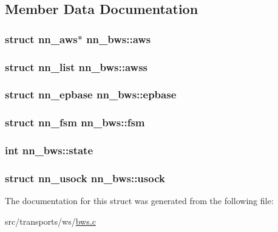 \subsection{Member Data Documentation}
\subsubsection[{aws}]{\setlength{\rightskip}{0pt plus 5cm}struct {\bf nn\+\_\+aws}$\ast$ nn\+\_\+bws\+::aws}\hypertarget{structnn__bws_a718a3274a89d9327c13c956cc9b105a4}{}\label{structnn__bws_a718a3274a89d9327c13c956cc9b105a4}
\subsubsection[{awss}]{\setlength{\rightskip}{0pt plus 5cm}struct {\bf nn\+\_\+list} nn\+\_\+bws\+::awss}\hypertarget{structnn__bws_ac1620e662d0c298115bcda10cfe6df91}{}\label{structnn__bws_ac1620e662d0c298115bcda10cfe6df91}
\subsubsection[{epbase}]{\setlength{\rightskip}{0pt plus 5cm}struct {\bf nn\+\_\+epbase} nn\+\_\+bws\+::epbase}\hypertarget{structnn__bws_ad00de0df67ca0663205c45e207e81bfb}{}\label{structnn__bws_ad00de0df67ca0663205c45e207e81bfb}
\subsubsection[{fsm}]{\setlength{\rightskip}{0pt plus 5cm}struct {\bf nn\+\_\+fsm} nn\+\_\+bws\+::fsm}\hypertarget{structnn__bws_a9418e42dd701ba439685ffaea8e97a02}{}\label{structnn__bws_a9418e42dd701ba439685ffaea8e97a02}
\subsubsection[{state}]{\setlength{\rightskip}{0pt plus 5cm}int nn\+\_\+bws\+::state}\hypertarget{structnn__bws_a0102f70d814af99ecedd5c2b0f471a2d}{}\label{structnn__bws_a0102f70d814af99ecedd5c2b0f471a2d}
\subsubsection[{usock}]{\setlength{\rightskip}{0pt plus 5cm}struct {\bf nn\+\_\+usock} nn\+\_\+bws\+::usock}\hypertarget{structnn__bws_a322ef3f4fe653a4002a8d6355fe48ee5}{}\label{structnn__bws_a322ef3f4fe653a4002a8d6355fe48ee5}


The documentation for this struct was generated from the following file\+:\begin{DoxyCompactItemize}
\item 
src/transports/ws/\hyperlink{bws_8c}{bws.\+c}\end{DoxyCompactItemize}
